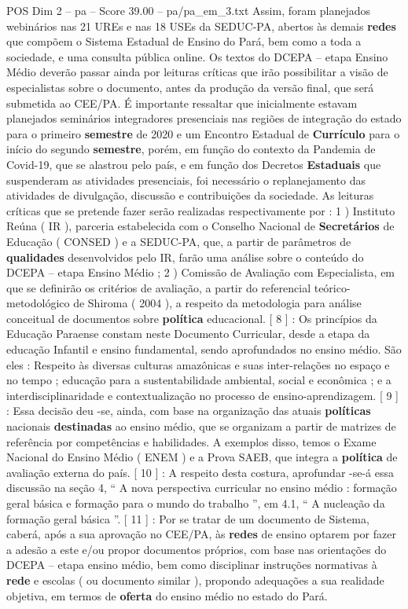 \begin{textsample}{POS Dim 2 – pa – Score 39.00 – pa/pa\_em\_3.txt}
Assim, foram planejados webinários nas 21 UREs e nas 18 USEs da SEDUC-PA, abertos às demais \textbf{redes} que compõem o Sistema Estadual de Ensino do Pará, bem como a toda a sociedade, e uma consulta pública online.
Os textos do DCEPA – etapa Ensino Médio deverão passar ainda por leituras críticas que irão possibilitar a visão de especialistas sobre o documento, antes da produção da versão final, que será submetida ao CEE/PA.
É importante ressaltar que inicialmente estavam planejados seminários integradores presenciais nas regiões de integração do estado para o primeiro \textbf{semestre} de 2020 e um Encontro Estadual de \textbf{Currículo} para o início do segundo \textbf{semestre}, porém, em função do contexto da Pandemia de Covid-19, que se alastrou pelo país, e em função dos Decretos \textbf{Estaduais} que suspenderam as atividades presenciais, foi necessário o replanejamento das atividades de divulgação, discussão e contribuições da sociedade.
As leituras críticas que se pretende fazer serão realizadas respectivamente por : 1 ) Instituto Reúna ( IR ), parceria estabelecida com o Conselho Nacional de \textbf{Secretários} de Educação ( CONSED ) e a SEDUC-PA, que, a partir de parâmetros de \textbf{qualidades} desenvolvidos pelo IR, farão uma análise sobre o conteúdo do DCEPA – etapa Ensino Médio ; 2 ) Comissão de Avaliação com Especialista, em que se definirão os critérios de avaliação, a partir do referencial teórico-metodológico de Shiroma ( 2004 ), a respeito da metodologia para análise conceitual de documentos sobre \textbf{política} educacional. [ 8 ] : Os princípios da Educação Paraense constam neste Documento Curricular, desde a etapa da educação Infantil e ensino fundamental, sendo aprofundados no ensino médio.
São eles : Respeito às diversas culturas amazônicas e suas inter-relações no espaço e no tempo ; educação para a sustentabilidade ambiental, social e econômica ; e a interdisciplinaridade e contextualização no processo de ensino-aprendizagem. [ 9 ] : Essa decisão deu -se, ainda, com base na organização das atuais \textbf{políticas} nacionais \textbf{destinadas} ao ensino médio, que se organizam a partir de matrizes de referência por competências e habilidades.
A exemplos disso, temos o Exame Nacional do Ensino Médio ( ENEM ) e a Prova SAEB, que integra a \textbf{política} de avaliação externa do país. [ 10 ] : A respeito desta costura, aprofundar -se-á essa discussão na seção 4, “ A nova perspectiva curricular no ensino médio : formação geral básica e formação para o mundo do trabalho ”, em 4.1, “ A nucleação da formação geral básica ”. [ 11 ] : Por se tratar de um documento de Sistema, caberá, após a sua aprovação no CEE/PA, às \textbf{redes} de ensino optarem por fazer a adesão a este e/ou propor documentos próprios, com base nas orientações do DCEPA – etapa ensino médio, bem como disciplinar instruções normativas à \textbf{rede} e escolas ( ou documento similar ), propondo adequações a sua realidade objetiva, em termos de \textbf{oferta} do ensino médio no estado do Pará.


\end{textsample}
